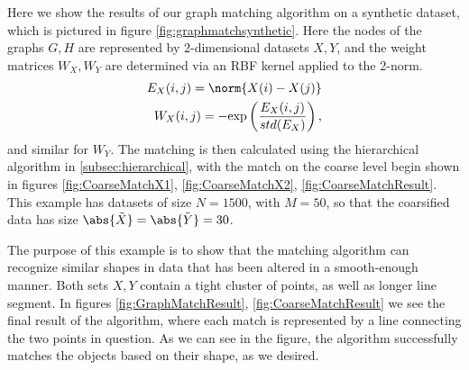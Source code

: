 \documentclass{article}[11pt]
\begin{document}
Here we show the results of our graph matching algorithm on a synthetic dataset,
which is pictured in figure \ref{fig:graphmatchsynthetic}. Here the nodes of the
graphs $G,H$ are represented by 2-dimensional datasets $X,Y$, and the weight
matrices $W_X,W_Y$ are determined via an RBF kernel applied to the 2-norm.
\begin{align}
  E_X(i,j) = \norm{X(i) - X(j)} \\
  W_X(i,j) = -\text{exp}\left(\frac{E_X(i,j)}{std(E_X)}\right), \label{eqn:graphweight}
\end{align}
and similar for $W_Y$. The matching is then calculated using the hierarchical
algorithm in \ref{subsec:hierarchical}, with the match on the coarse level begin
shown in figures \ref{fig:CoarseMatchX1}, \ref{fig:CoarseMatchX2},
\ref{fig:CoarseMatchResult}. This example has datasets of size $N = 1500$, with
$M=50$, so that the coarsified data has size
$\abs{\tilde{X}} = \abs{\tilde{Y}} = 30$.

The purpose of this example is to show that the matching algorithm can recognize
similar shapes in data that has been altered in a smooth-enough manner. Both
sets $X,Y$ contain a tight cluster of points, as well as longer line segment. In
figures \ref{fig:GraphMatchResult}, \ref{fig:CoarseMatchResult} we see the final
result of the algorithm, where each match is represented by a line connecting
the two points in question. As we can see in the figure, the algorithm
successfully matches the objects based on their shape, as we desired.
\end{document}
